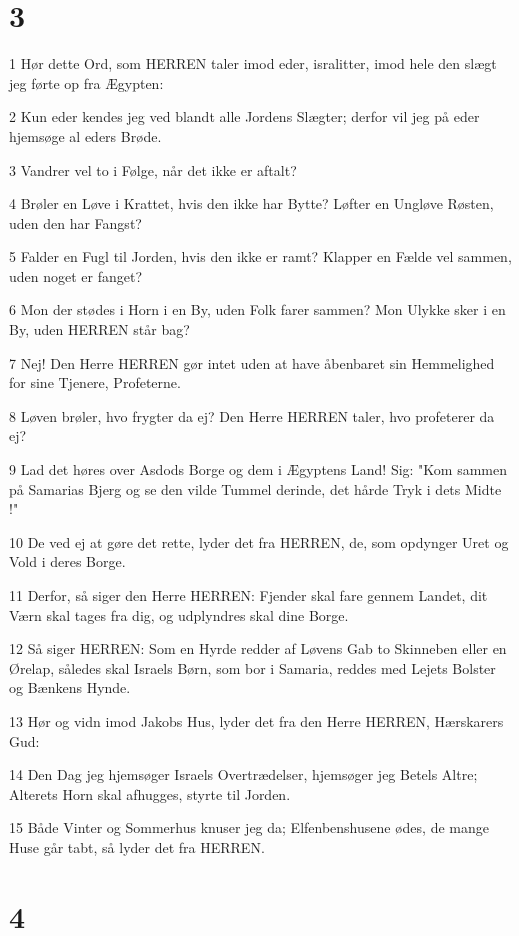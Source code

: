 \chapter{3}

\par 1 Hør dette Ord, som HERREN taler imod eder, isralitter, imod hele den slægt jeg førte op fra Ægypten:
\par 2 Kun eder kendes jeg ved blandt alle Jordens Slægter; derfor vil jeg på eder hjemsøge al eders Brøde.
\par 3 Vandrer vel to i Følge, når det ikke er aftalt?
\par 4 Brøler en Løve i Krattet, hvis den ikke har Bytte? Løfter en Ungløve Røsten, uden den har Fangst?
\par 5 Falder en Fugl til Jorden, hvis den ikke er ramt? Klapper en Fælde vel sammen, uden noget er fanget?
\par 6 Mon der stødes i Horn i en By, uden Folk farer sammen? Mon Ulykke sker i en By, uden HERREN står bag?
\par 7 Nej! Den Herre HERREN gør intet uden at have åbenbaret sin Hemmelighed for sine Tjenere, Profeterne.
\par 8 Løven brøler, hvo frygter da ej? Den Herre HERREN taler, hvo profeterer da ej?
\par 9 Lad det høres over Asdods Borge og dem i Ægyptens Land! Sig: "Kom sammen på Samarias Bjerg og se den vilde Tummel derinde, det hårde Tryk i dets Midte !"
\par 10 De ved ej at gøre det rette, lyder det fra HERREN, de, som opdynger Uret og Vold i deres Borge.
\par 11 Derfor, så siger den Herre HERREN: Fjender skal fare gennem Landet, dit Værn skal tages fra dig, og udplyndres skal dine Borge.
\par 12 Så siger HERREN: Som en Hyrde redder af Løvens Gab to Skinneben eller en Ørelap, således skal Israels Børn, som bor i Samaria, reddes med Lejets Bolster og Bænkens Hynde.
\par 13 Hør og vidn imod Jakobs Hus, lyder det fra den Herre HERREN, Hærskarers Gud:
\par 14 Den Dag jeg hjemsøger Israels Overtrædelser, hjemsøger jeg Betels Altre; Alterets Horn skal afhugges, styrte til Jorden.
\par 15 Både Vinter og Sommerhus knuser jeg da; Elfenbenshusene ødes, de mange Huse går tabt, så lyder det fra HERREN.

\chapter{4}

